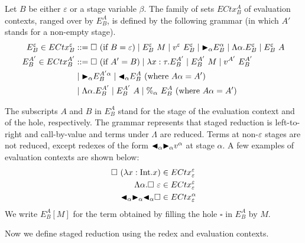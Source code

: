\begin{definition}
  Let $B$ be either \(\varepsilon\) or a stage variable \(\beta\).
  The family of sets $ECtx^A_B$ of evaluation contexts, ranged over by $E^A_B$, is defined by the following grammar (in which $A'$ stands for a non-empty stage).
  \begin{align*}
    E^\varepsilon_B \in ECtx^\varepsilon_B & ::= \square\ (\text{if\ } B = \varepsilon)
    \mid E^\varepsilon_B\ M \mid v^\varepsilon\ E^\varepsilon_B \mid {\mathop{\blacktriangleright}}_\alpha E^\alpha_B
    \mid \Lambda\alpha.E^\varepsilon_B \mid E^\varepsilon_B\ A                                                                                    \\
    E^{A'}_B \in ECtx^{A'}_B               & ::= \square\ (\text{if } A' = B) \mid \lambda x:\tau.E^{A'}_B \mid E^{A'}_B\ M \mid v^{A'}\ E^{A'}_B \\
                                           & \mid {\mathop{\blacktriangleright}}_\alpha E^{A'\alpha}_B \mid {\mathop{\blacktriangleleft}}_\alpha E^{A}_B \ (\text{where } A\alpha = A')               \\
                                           & \mid \Lambda\alpha.E^{A'}_B \mid E^{A'}_B\ A \mid \%_\alpha\ E^{A}_B \ (\text{where } A\alpha = A')
  \end{align*}
\end{definition}

The subscripts $A$ and $B$ in $E^A_B$ stand for the stage of the evaluation
context and of the hole, respectively. The grammar represents that staged
reduction is left-to-right and call-by-value and terms under \(\Lambda\) are
reduced. Terms at non-$\varepsilon$ stages are not reduced, except
redexes of the form \({\mathop{\blacktriangleleft}}_\alpha {\mathop{\blacktriangleright}}_\alpha v^\alpha\) at stage \(\alpha\).
A few examples of
evaluation contexts are shown below:
\begin{align*}
  \square\ (\lambda x:\textrm{Int}.x)                  & \in  ECtx^\varepsilon_\varepsilon \\
  \Lambda\alpha.\square\ \varepsilon            & \in ECtx^\varepsilon_\varepsilon  \\
  {\mathop{\blacktriangleleft}}_\alpha {\mathop{\blacktriangleright}}_\alpha {\mathop{\blacktriangleleft}}_\alpha \square & \in ECtx^\alpha_\varepsilon
\end{align*}
%
We write $E^A_B[M]$ for the term obtained by filling the hole $\square$ in $E^A_B$ by $M$.

Now we define staged reduction using the redex and evaluation contexts.

